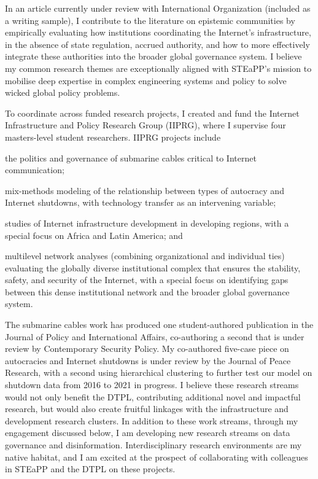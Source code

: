 \documentclass[11pt]{letter}
\begin{document}
\begin{letter}
%
%
In an article currently under review with International Organization (included as a writing sample), I contribute to the literature on epistemic communities by empirically evaluating how institutions coordinating the Internet's infrastructure, in the absence of state regulation, accrued authority, and how to more effectively integrate these authorities into the broader global governance system.
%
I believe my common research themes are exceptionally aligned with STEaPP's mission to mobilise deep expertise in complex engineering systems and policy to solve wicked global policy problems.

To coordinate across funded research projects, I created and fund the Internet Infrastructure and Policy Research Group (IIPRG), where I supervise four masters-level student researchers.
%
IIPRG projects include %
%
\begin{inparaenum}
  \item the politics and governance of submarine cables critical to Internet communication; 
  \item mix-methods modeling of the relationship between types of autocracy and Internet shutdowns, with technology transfer as an intervening variable; 
  \item studies of Internet infrastructure development in developing regions, with a special focus on Africa and Latin America; and 
  \item multilevel network analyses (combining organizational and individual ties) evaluating the globally diverse institutional complex that ensures the stability, safety, and security of the Internet, with a special focus on identifying gaps between this dense institutional network and the broader global governance system.
\end{inparaenum}  
%
The submarine cables work has produced one student-authored publication in the Journal of Policy and International Affairs, co-authoring a second that is under review by Contemporary Security Policy.
%
My co-authored five-case piece on autocracies and Internet shutdowns is under review by the Journal of Peace Research, with a second using hierarchical clustering to further test our model on shutdown data from 2016 to 2021 in progress. 
%
I believe these research streams would not only benefit the DTPL, contributing additional novel and impactful research, but would also create fruitful linkages with the infrastructure and development research clusters.
% 
In addition to these work streams, through my engagement discussed below, I am developing new research streams on data governance and disinformation.
%
Interdisciplinary research environments are my native habitat, and I am excited at the prospect of collaborating with colleagues in STEaPP and the DTPL on these projects.




\end{letter}
\end{document}
